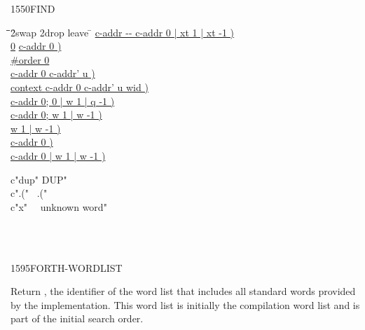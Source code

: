 \begin{worddef}{1550}{FIND}
\begin{implement}
		\begin{tabbing}
		\tab \= \tab \= \tab \= \tab \= 2swap 2drop leave \tab \= \kill
		\uline{\word{:}   c-addr -{}- c-addr 0 | xt 1 | xt -1 )} \+ \\
			\uline{0} 														\>\>\>\>	\uline{ c-addr 0 )} \\
			\uline{\#order  0 } \+ \\
				\uline{ }							\>\>\>	\uline{ c-addr 0 c-addr' u )} \\
				\uline{  context \word{+} }		\>\>\>	\uline{ c-addr 0 c-addr' u wid )} \\
				\uline{}							\>\>\>	\uline{ c-addr 0; 0 | w 1 | q -1 )} \\
				\uline{ }								\>\>\>	\uline{\word{p} c-addr 0; w 1 | w -1 )} \+ \\
				\>	\uline{  }		\>		\uline{ w 1 | w -1 )}  \\
				\uline{}										\>\>	\uline{ c-addr 0 )} \- \\
			\uline{}											\>\>\>	\uline{ c-addr 0 | w 1 | w -1 )} \- \\
		\uline{\word{;}}
		\end{tabbing}
\cbend
	\end{implement}

	\begin{testing}\ttfamily
		\word{:} c"dup"  DUP" \word{;} \\
		\word{:} c".("~  .("~ \word{;} \\
		\word{:} c"x"~~  unknown word" \word{;}

		 \\
		 \\
	\end{testing}
\end{worddef}


\begin{worddef}{1595}{FORTH-WORDLIST}
\item {}

	Return , the identifier of the word list that includes
	all standard words provided by the implementation. This word list
	is initially the compilation word list and is part of the initial
	search order.

	\begin{testing}
	\end{testing}
\end{worddef}


